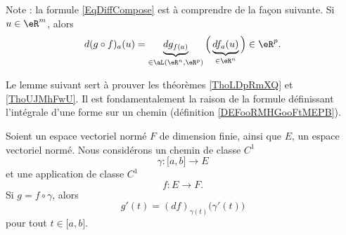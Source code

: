 \begin{remark}
	Note : la formule \eqref{EqDiffCompose} est à comprendre de la façon suivante. Si $u\in\eR^m$, alors
	\begin{equation}
		d(g\circ f)_a(u)=\underbrace{dg_{f(a)}}_{\in\aL(\eR^n,\eR^p)}\Big( \underbrace{df_a(u)}_{\in\eR^n} \Big)\in\eR^p.
	\end{equation}
\end{remark}

Le lemme suivant sert à prouver les théorèmes \ref{ThoLDpRmXQ} et \ref{ThoUJMhFwU}. Il est fondamentalement la raison de la formule définissant l'intégrale d'une forme sur un chemin (définition \ref{DEFooRMHGooFtMEPB}).
\begin{lemma}        \label{LEMooKNBVooQSowos}
	Soient un espace vectoriel normé \( F\) de dimension finie, ainsi que \( E\), un espace vectoriel normé. Nous considérons un chemin de classe \( C^1\)
	\begin{equation}
		\gamma\colon \mathopen[ a , b \mathclose]\to E
	\end{equation}
	et une application de classe \( C^1\)
	\begin{equation}
		f\colon E\to F.
	\end{equation}
	Si \( g=f\circ\gamma\), alors
	\begin{equation}
		g'(t)=(df)_{\gamma(t)}\big( \gamma'(t) \big)
	\end{equation}
	pour tout \( t\in \mathopen[ a , b \mathclose]\).
\end{lemma}

